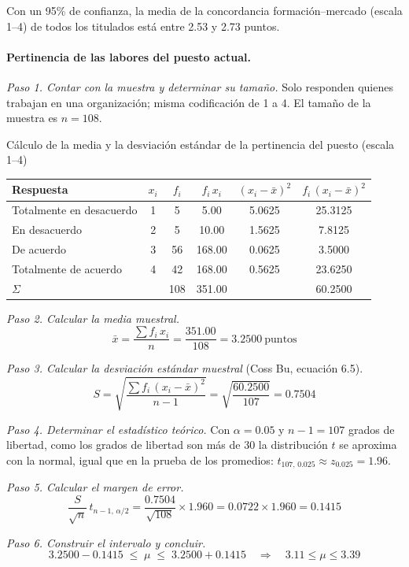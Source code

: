 Con un 95\% de confianza, la media de la concordancia formación--mercado (escala 1--4) de todos los titulados está entre 2.53 y 2.73 puntos.

\paragraph{Pertinencia de las labores del puesto actual.}

\textit{Paso 1. Contar con la muestra y determinar su tamaño.} Solo responden quienes trabajan en una organización; misma codificación de 1 a 4. El tamaño de la muestra es $n = 108$.

\begin{mitabla}{Cálculo de la media y la desviación estándar de la pertinencia del puesto (escala 1--4)}
\begin{tabular}{lccccc}
\toprule
Respuesta & $x_i$ & $f_i$ & $f_i\,x_i$ & $(x_i-\bar{x})^2$ & $f_i\,(x_i-\bar{x})^2$ \\
\midrule
Totalmente en desacuerdo & 1 & 5 & 5.00 & 5.0625 & 25.3125 \\
En desacuerdo & 2 & 5 & 10.00 & 1.5625 & 7.8125 \\
De acuerdo & 3 & 56 & 168.00 & 0.0625 & 3.5000 \\
Totalmente de acuerdo & 4 & 42 & 168.00 & 0.5625 & 23.6250 \\
\midrule
$\Sigma$ & & 108 & 351.00 & & 60.2500 \\
\bottomrule
\end{tabular}
\end{mitabla}

\textit{Paso 2. Calcular la media muestral.}
\[
\bar{x} = \frac{\sum f_i\,x_i}{n} = \frac{351.00}{108} = 3.2500\ \text{puntos}
\]

\textit{Paso 3. Calcular la desviación estándar muestral} (Coss Bu, ecuación 6.5).
\[
S = \sqrt{\frac{\sum f_i\,(x_i-\bar{x})^2}{n-1}} = \sqrt{\frac{60.2500}{107}} = 0.7504
\]

\textit{Paso 4. Determinar el estadístico teórico.} Con $\alpha = 0.05$ y $n-1 = 107$ grados de libertad, como los grados de libertad son más de 30 la distribución $t$ se aproxima con la normal, igual que en la prueba de los promedios: $t_{107,\,0.025} \approx z_{0.025} = 1.96$.

\textit{Paso 5. Calcular el margen de error.}
\[
\frac{S}{\sqrt{n}}\,t_{n-1,\,\alpha/2} = \frac{0.7504}{\sqrt{108}}\times 1.960 = 0.0722 \times 1.960 = 0.1415
\]

\textit{Paso 6. Construir el intervalo y concluir.}
\[
3.2500 - 0.1415 \;\le\; \mu \;\le\; 3.2500 + 0.1415 \quad\Longrightarrow\quad 3.11 \le \mu \le 3.39
\]

